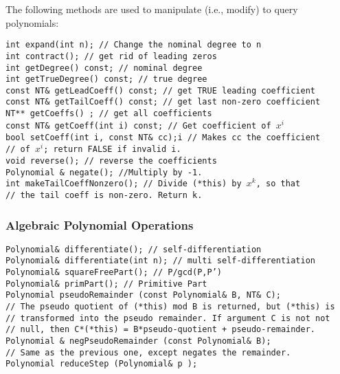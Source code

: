 The following methods are used to manipulate (i.e., modify)
to query polynomials:

\begin{progb} {
\> \tt  int expand(int n);      // Change the nominal degree to n \\
\> \tt  int contract();	        // get rid of leading zeros \\
\> \tt  int getDegree() const;	// nominal degree \\
\> \tt  int getTrueDegree() const;  // true degree \\
\> \tt  const NT\& getLeadCoeff() const; // get TRUE leading coefficient \\
\> \tt  const NT\& getTailCoeff() const; // get last non-zero coefficient\\
\> \tt  NT** getCoeffs() ;		// get all coefficients \\
\> \tt  const NT\& getCoeff(int i) const; // Get coefficient of $x^i$ \\
\> \tt  bool setCoeff(int i, const NT\& cc);i // Makes cc the coefficient\\
\>\>	// of $x^i$; return FALSE if invalid i. \\
\> \tt  void reverse();		// reverse the coefficients \\
\> \tt  Polynomial \& negate(); //Multiply by -1.\\
\> \tt  int makeTailCoeffNonzero(); // Divide (*this) by $x^k$, so that\\
\>\>    // the tail coeff is non-zero. Return k.\\
}\end{progb}

\subsubsection{Algebraic Polynomial Operations}

\begin{progb}{
\>\tt  Polynomial\& differentiate();   // self-differentiation\\
\>\tt  Polynomial\& differentiate(int n); // multi self-differentiation\\
\>\tt  Polynomial\& squareFreePart();  // P/gcd(P,P') \\
\>\tt  Polynomial\& primPart(); // Primitive Part \\
\>\tt  Polynomial pseudoRemainder (const Polynomial\& B, NT\& C);\\
\>\>  // The pseudo quotient of (*this) mod B is returned, but (*this) is\\
\>\>  // transformed into the pseudo remainder.  If argument C is not not\\
\>\>  // null, then C*(*this) = B*pseudo-quotient + pseudo-remainder.\\
\>\tt   Polynomial \& negPseudoRemainder (const Polynomial\& B); \\
\>\>    // Same as the previous one, except negates the remainder.\\
\>\tt  Polynomial reduceStep (Polynomial\& p ); \\
}\end{progb}

